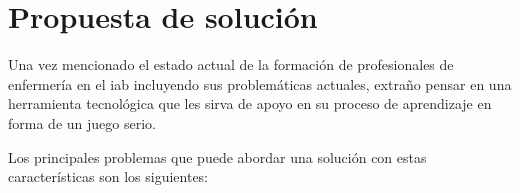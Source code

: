 
\section{Propuesta de solución}

%

Una vez mencionado el estado actual de la formación de profesionales de
enfermería en el \Gls{iab} incluyendo sus problemáticas actuales,  extraño pensar en una herramienta tecnológica que les
sirva de apoyo en su proceso de aprendizaje en forma de un juego serio.

Los principales problemas que puede abordar una solución con estas
características son los siguientes:


